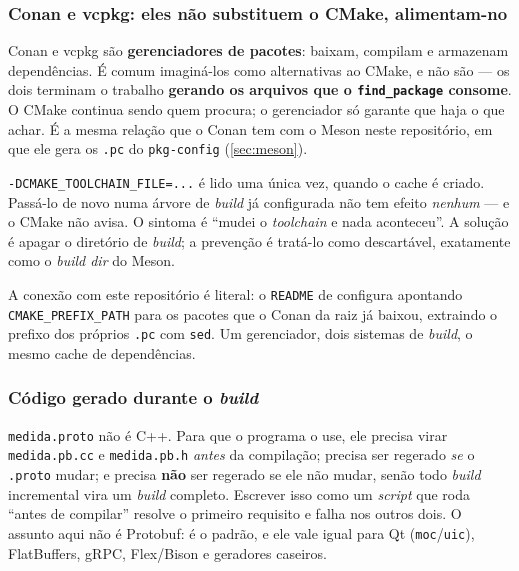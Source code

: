 \subsubsection{Conan e vcpkg: eles não substituem o CMake, alimentam-no}

Conan e vcpkg são \textbf{gerenciadores de pacotes}: baixam, compilam e
armazenam dependências. É comum imaginá-los como alternativas ao CMake, e não
são --- os dois terminam o trabalho \textbf{gerando os arquivos que o
\texttt{find\_package} consome}. O CMake continua sendo quem procura; o
gerenciador só garante que haja o que achar. É a mesma relação que o Conan tem
com o Meson neste repositório, em que ele gera os \texttt{.pc} do
\texttt{pkg-config} (\cref{sec:meson}).

\begin{armadilha}
\texttt{-DCMAKE\_TOOLCHAIN\_FILE=...} é lido uma única vez, quando o cache é
criado. Passá-lo de novo numa árvore de \emph{build} já configurada não tem
efeito \emph{nenhum} --- e o CMake não avisa. O sintoma é ``mudei o
\emph{toolchain} e nada aconteceu''. A solução é apagar o diretório de
\emph{build}; a prevenção é tratá-lo como descartável, exatamente como o
\emph{build dir} do Meson.
\end{armadilha}

A conexão com este repositório é literal: o \texttt{README} de
 configura apontando \texttt{CMAKE\_PREFIX\_PATH} para os
pacotes que o Conan da raiz já baixou, extraindo o prefixo dos próprios
\texttt{.pc} com \texttt{sed}. Um gerenciador, dois sistemas de \emph{build},
o mesmo cache de dependências.

\subsubsection{Código gerado durante o \emph{build}}

\begin{porque}
\texttt{medida.proto} não é C++. Para que o programa o use, ele precisa virar
\texttt{medida.pb.cc} e \texttt{medida.pb.h} \emph{antes} da compilação; precisa
ser regerado \emph{se} o \texttt{.proto} mudar; e precisa \textbf{não} ser
regerado se ele não mudar, senão todo \emph{build} incremental vira um
\emph{build} completo. Escrever isso como um \emph{script} que roda ``antes de
compilar'' resolve o primeiro requisito e falha nos outros dois. O assunto aqui
não é Protobuf: é o padrão, e ele vale igual para Qt (\texttt{moc}/\texttt{uic}),
FlatBuffers, gRPC, Flex/Bison e geradores caseiros.
\end{porque}

